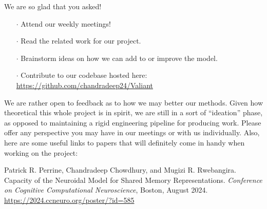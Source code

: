 \documentclass{article}
\begin{document}
We are so glad that you asked!

\begin{itemize}
\item[$\cdot$]Attend our weekly meetings!
\item[$\cdot$]Read the related work for our project.
\item[$\cdot$]Brainstorm ideas on how we can add to or improve the model.
\item[$\cdot$]Contribute to our codebase hosted here: \url{https://github.com/chandradeep24/Valiant}
\end{itemize} 

\noindent We are rather open to feedback as to how we may better our methods. Given how theoretical this whole project is in spirit, we are still in a sort of ``ideation'' phase, as opposed to maintaining a rigid engineering pipeline for producing work. Please offer any perspective you may have in our meetings or with us individually. Also, here are some useful links to papers that will definitely come in handy when working on the project: \\

\vspace{4mm}

\renewcommand{\section}[2]{}

\begin{thebibliography}{1}
Patrick R. Perrine, Chandradeep Chowdhury, and Mugizi R. Rwebangira. Capacity of the Neuroidal Model for Shared Memory Representations. \textit{Conference on Cognitive Computational Neuroscience}, Boston, August 2024. \url{https://2024.ccneuro.org/poster/?id=585}
\end{thebibliography}

\vspace{4mm}
\end{document}
